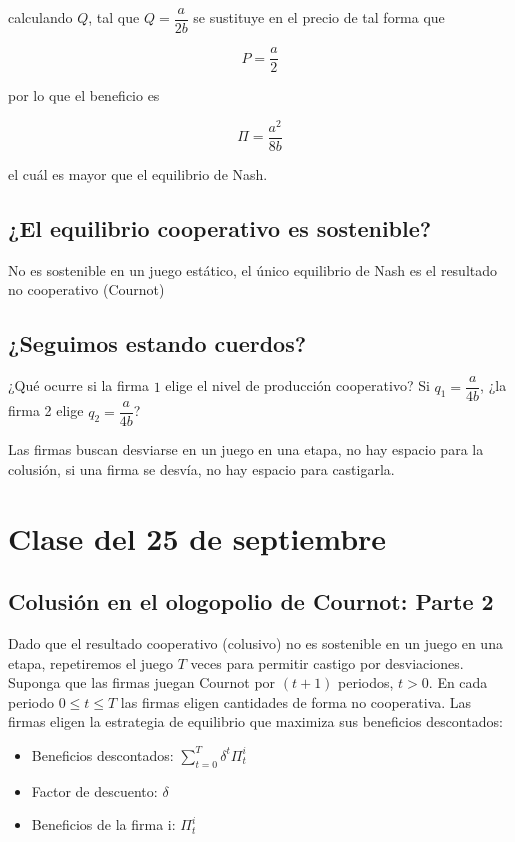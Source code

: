 \documentclass[letterpaper,12pt,twocolumn]{report}
\begin{document}
calculando $Q$, tal que $Q=\dfrac{a}{2b}$ se sustituye en el precio de tal forma que

$$ P=\dfrac{a}{2}$$

por lo que el beneficio es

$$ \Pi =  \dfrac{a^2}{8b}$$

el cuál es mayor que el equilibrio de Nash.

\subsection*{¿El equilibrio cooperativo es sostenible?}

No es sostenible en un juego estático, el único equilibrio de Nash es el resultado no cooperativo (Cournot)

\subsection*{¿Seguimos estando cuerdos?}

¿Qué ocurre si la firma $1$ elige el nivel de producción cooperativo? Si $q_1=\dfrac{a}{4b}$, ¿la firma 2 elige $q_2=\dfrac{a}{4b}$?

Las firmas buscan desviarse en un juego en una etapa, no hay espacio para la colusión, si una firma se desvía, no hay espacio para castigarla.

\section{Clase del 25 de septiembre}

\subsection*{Colusión en el ologopolio de Cournot: Parte 2}

Dado que el resultado cooperativo (colusivo) no es sostenible en un juego en una etapa, repetiremos el juego $T$ veces para permitir castigo por desviaciones. Suponga que las firmas juegan Cournot por $(t+1)$ periodos, $t>0$. En cada periodo $0\leq t \leq T$ las firmas eligen cantidades de forma no cooperativa. Las firmas eligen la estrategia de equilibrio que maximiza sus beneficios descontados:

\begin{itemize}
	\item Beneficios descontados:  $\sum_{t=0}^{T}\delta^t\Pi_t^i$
	\item Factor de descuento: $\delta$
	\item Beneficios de la firma i: $\Pi_t^i$
\end{itemize}
\end{document}
